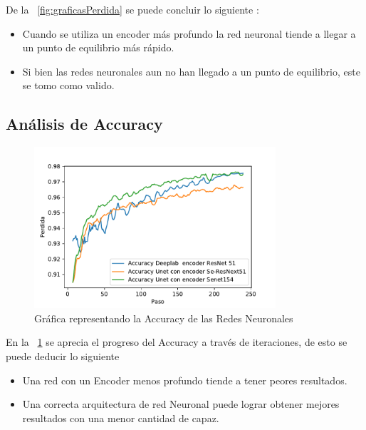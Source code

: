 De la \figurename~\ref{fig:graficasPerdida} se puede concluir lo siguiente :
\begin{itemize}
    \item Cuando se utiliza un encoder más profundo la red neuronal tiende a llegar a un punto de equilibrio más rápido.
    \item Si bien las redes neuronales aun no han llegado a un punto de equilibrio, este se tomo como valido.
\end{itemize}{}


\subsection{Análisis de \gls{Accuracy}}

\begin{figure}[H]
    \centering
    \includegraphics[width=0.8\textwidth]{images/funciones/comparacionesAcc.pdf}
    \caption{Gráfica representando la \gls{Accuracy} de las Redes Neuronales}
    \label{fig:Accuracy}
\end{figure}{}
En la \figurename~\ref{fig:Accuracy} se aprecia el progreso del \gls{Accuracy} a través de iteraciones, de esto se puede deducir lo siguiente 
\begin{itemize}
    \item Una red con un Encoder menos profundo tiende a tener peores resultados.
    \item Una correcta arquitectura de red Neuronal puede lograr obtener mejores resultados con una menor cantidad de capaz.
\end{itemize}


